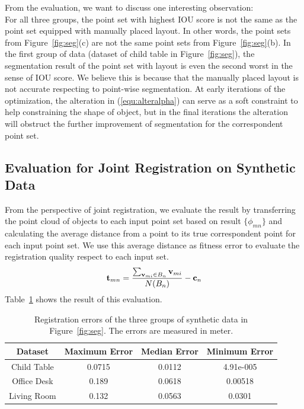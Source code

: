 From the evaluation, we want to discuss one interesting observation:\\
%
For all three groups, the point set with highest IOU score is not the same as the point set equipped with manually placed layout.
In other words, the point sets from Figure~\ref{fig:seg}(c) are not the same point sets from Figure~\ref{fig:seg}(b). 
In the first group of data (dataset of child table in Figure~\ref{fig:seg}), the segmentation result of the point set with layout is even the second worst in the sense of IOU score. We believe this is because that the manually placed layout is not accurate respecting to point-wise segmentation. 
At early iterations of the optimization, the alteration in (\ref{equ:alteralpha}) can serve as a soft constraint to help constraining the shape of object, but in the final iterations the alteration will obstruct the further improvement of segmentation for the correspondent point set. 


\subsection{Evaluation for Joint Registration on Synthetic Data}
%
From the perspective of joint registration, we evaluate the result by transferring the point cloud of objects to each input point set based on result $\{\phi_{mn}\}$ and calculating the average distance from a point to its true correspondent point for each input point set.
%
We use this average distance as fitness error to evaluate the registration quality respect to each input set.
\begin{equation}
\label{equ:error}
\mathbf{t}_{mn}=\frac{\sum_{\mathbf{v}_{mi} \in B_n}\mathbf{v}_{mi}}{N(B_n)}-\mathbf{c}_n
\end{equation}
Table~\ref{tab:regerror} shows the result of this evaluation.

\begin{table}
	\centering
	\begin{tabular}{c c c c}
		Dataset & Maximum Error & Median Error & Minimum Error \\
		\hline
		Child Table & 0.0715 & 0.0112 & 4.91e-005 \\   
		Office Desk & 0.189  & 0.0618 & 0.00518 \\
		Living Room & 0.132  & 0.0563 & 0.0301\\
	\end{tabular}
	\caption{Registration errors of the three groups of synthetic data in Figure~\ref{fig:seg}. The errors are measured in meter. }
	\label{tab:regerror}
\end{table}



